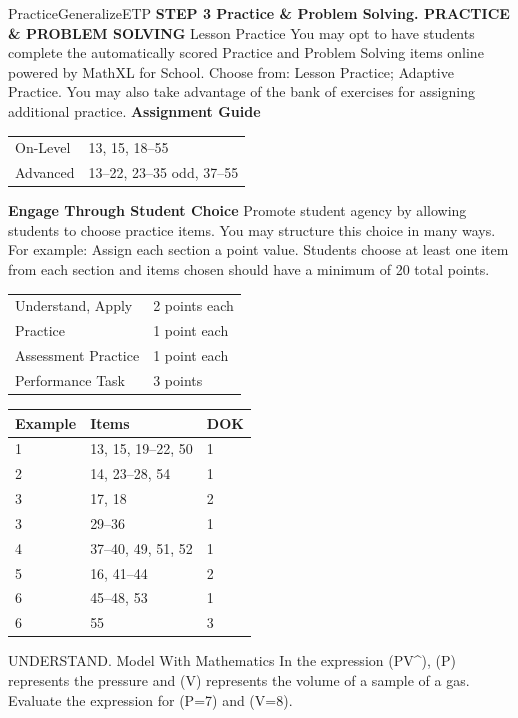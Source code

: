 \documentclass{article}
\newenvironment{item-analysis}{}{}      %
\newenvironment{practice}[2]{}{}        %
\newenvironment{te-addendum}[2]{}{}     %
\newcommand{\answer}[1]{}               %
\newcommand{\te}[1]{}                   %
\begin{document}
\begin{te-addendum}{Practice}{GeneralizeETP}
\textbf{STEP 3 Practice \& Problem Solving. PRACTICE \& PROBLEM SOLVING}
Lesson Practice You may opt to have students complete the automatically scored Practice and Problem Solving items online powered by MathXL for School.
Choose from: Lesson Practice; Adaptive Practice.
You may also take advantage of the bank of exercises for assigning additional practice.
\textbf{Assignment Guide}
\begin{tabular}{ll}
On-Level & 13, 15, 18--55 \\
Advanced & 13--22, 23--35 odd, 37--55 \\
\end{tabular}
\textbf{Engage Through Student Choice}
Promote student agency by allowing students to choose practice items. You may structure this choice in many ways.
For example:
Assign each section a point value. Students choose at least one item from each section and items chosen should have a minimum of 20 total points.
\begin{tabular}{ll}
Understand, Apply & 2 points each \\
Practice & 1 point each \\
Assessment Practice & 1 point each \\
Performance Task & 3 points \\
\end{tabular}
\te{Practice \& Problem Solving and video tutorials are available at SavvasRealize.com. Scan the QR code to access a video tutorial. Practice.}
\end{te-addendum}
\begin{item-analysis}
\begin{tabular}{lll}
\toprule
Example & Items & DOK \\
\midrule
1 & 13, 15, 19--22, 50 & 1 \\
2 & 14, 23--28, 54 & 1 \\
3 & 17, 18 & 2 \\
3 & 29--36 & 1 \\
4 & 37--40, 49, 51, 52 & 1 \\
5 & 16, 41--44 & 2 \\
6 & 45--48, 53 & 1 \\
6 & 55 & 3 \\
\bottomrule
\end{tabular}
\end{item-analysis}
\begin{practice}{13}{1}
UNDERSTAND. Model With Mathematics In the expression (PV^{}), (P) represents the pressure and (V) represents the volume of a sample of a gas. Evaluate the expression for (P=7) and (V=8).
\answer{112}
\end{practice}
\end{document}
